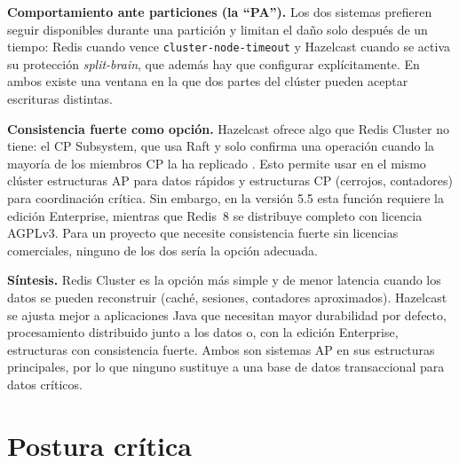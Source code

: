\documentclass[11pt,a4paper]{article}
\begin{document}
\textbf{Comportamiento ante particiones (la ``PA'').} Los dos sistemas
prefieren seguir disponibles durante una partición y limitan el daño solo
después de un tiempo: Redis cuando vence \texttt{cluster-node-timeout} y
Hazelcast cuando se activa su protección \emph{split-brain}, que además hay
que configurar explícitamente. En ambos existe una ventana en la que dos
partes del clúster pueden aceptar escrituras distintas.

\textbf{Consistencia fuerte como opción.} Hazelcast ofrece algo que Redis
Cluster no tiene: el CP Subsystem, que usa Raft y solo confirma una operación
cuando la mayoría de los miembros CP la ha replicado
\cite{hazelcast2026cpsubsystem}. Esto permite usar en el mismo clúster
estructuras AP para datos rápidos y estructuras CP (cerrojos, contadores) para
coordinación crítica. Sin embargo, en la versión 5.5 esta función requiere la
edición Enterprise, mientras que Redis~8 se distribuye completo con licencia
AGPLv3. Para un proyecto que necesite consistencia fuerte sin licencias
comerciales, ninguno de los dos sería la opción adecuada.

\textbf{Síntesis.} Redis Cluster es la opción más simple y de menor latencia
cuando los datos se pueden reconstruir (caché, sesiones, contadores
aproximados). Hazelcast se ajusta mejor a aplicaciones Java que necesitan
mayor durabilidad por defecto, procesamiento distribuido junto a los datos o,
con la edición Enterprise, estructuras con consistencia fuerte. Ambos son
sistemas AP en sus estructuras principales, por lo que ninguno sustituye a
una base de datos transaccional para datos críticos.

\section{Postura crítica}
\label{sec:postura}
\end{document}
